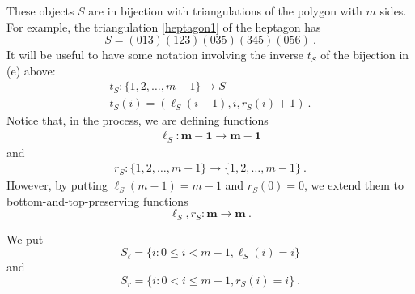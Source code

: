 \documentclass[a4paper,12pt,reqno]{amsart}
\theoremstyle{definition}
\theoremstyle{fact}
\theoremstyle{genquest}
\theoremstyle{step}
\newcommand{\lra}{\longrightarrow}
\begin{document}
These objects $S$ are in bijection with triangulations of the polygon with $m$ sides.
For example, the triangulation \eqref{heptagon1} of the heptagon has 
\begin{equation}
S=(013)(123)(035)(345)(056) \ .
\end{equation} 
It will be useful to have some notation involving the inverse $t_S$ of the bijection in (e) above:
\begin{eqnarray}\label{tlr}
t_S : \{1,2,\dots ,m-1\} \lra S \nonumber \\
t_S(i) = (\ell_S(i-1), i , r_S(i)+1) \ .
\end{eqnarray}
Notice that, in the process, we are defining functions 
\begin{eqnarray}
\ell_S : \mathbf{m-1} \lra \mathbf{m-1}
\end{eqnarray}
and 
\begin{eqnarray}\label{rightfns}
r_S: \{1,2,\dots ,m-1\} \lra \{1,2,\dots ,m-1\} \ .
\end{eqnarray}
However, by putting $\ell_S(m-1)=m-1$ and $r_S(0)=0$, we extend them to bottom-and-top-preserving functions
\begin{equation}\label{lr}
\ell_S, r_S : \mathbf{m} \lra \mathbf{m} \ .
\end{equation}

We put 
\begin{equation}
S_{\ell} = \{i : 0\le i<m-1, \ell_S(i)=i \}
\end{equation}
and
\begin{equation}
S_r = \{i :  0<i\le m-1, r_S(i)=i \} \ .
\end{equation}
\end{document}
